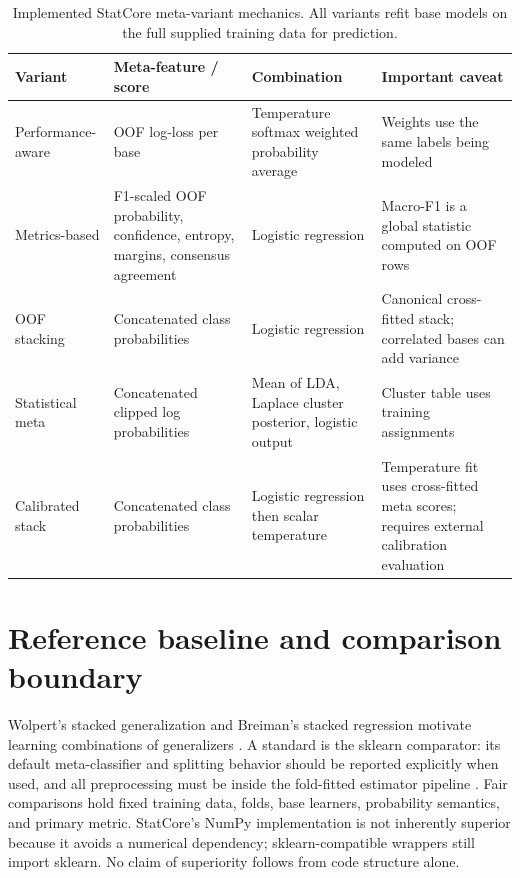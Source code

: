 ﻿\documentclass[conference]{IEEEtran}
\begin{document}
\begin{table}[t]
\caption{Implemented StatCore meta-variant mechanics. All variants refit base models on the full supplied training data for prediction.}
\label{tab:variants}
\centering
\small
\begin{tabular}{p{}p{}p{}p{}}
\toprule
Variant & Meta-feature / score & Combination & Important caveat\\
\midrule
Performance-aware & OOF log-loss per base & Temperature softmax weighted probability average & Weights use the same labels being modeled\\
Metrics-based & F1-scaled OOF probability, confidence, entropy, margins, consensus agreement & Logistic regression & Macro-F1 is a global statistic computed on OOF rows\\
OOF stacking & Concatenated class probabilities & Logistic regression & Canonical cross-fitted stack; correlated bases can add variance\\
Statistical meta & Concatenated clipped log probabilities & Mean of LDA, Laplace cluster posterior, logistic output & Cluster table uses training assignments\\
Calibrated stack & Concatenated class probabilities & Logistic regression then scalar temperature & Temperature fit uses cross-fitted meta scores; requires external calibration evaluation\\
\bottomrule
\end{tabular}
\end{table}

\section{Reference baseline and comparison boundary}
Wolpert's stacked generalization and Breiman's stacked regression motivate learning combinations of generalizers \cite{wolpert1992,breiman1996}. A standard  is the sklearn comparator: its default meta-classifier and splitting behavior should be reported explicitly when used, and all preprocessing must be inside the fold-fitted estimator pipeline \cite{pedregosa2011}. Fair comparisons hold fixed training data, folds, base learners, probability semantics, and primary metric. StatCore's NumPy implementation is not inherently superior because it avoids a numerical dependency; sklearn-compatible wrappers still import sklearn. No claim of superiority follows from code structure alone.
\end{document}
